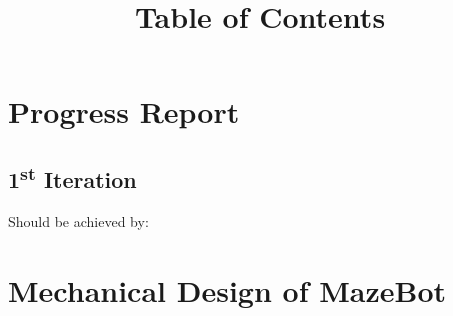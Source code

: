 \documentclass[11pt]{article}
\date{}
\title{Table of Contents}
\newcommand{\ts}{\textsuperscript}
\begin{document}
\maketitle

\tableofcontents

\newpage


\section{Progress Report}
\subsection*{1\ts{st} Iteration}

Should be achieved by:



\newpage

\section{Mechanical Design of MazeBot}
\end{document}
